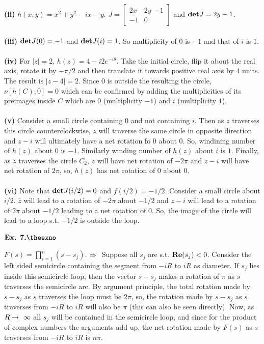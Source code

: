 \documentclass{article}
\def\tf{\textbf}
\def\mf{\ensuremath\mathbf}
\def\det{\ensuremath\mf{det}}
\def\rto{\ensuremath\rightarrow\ }
\def\Rto{\ensuremath\Rightarrow\ }
\newcounter{exno}
\begin{document}
\tf{(ii)} $h(x,y) = x^2+y^2 -ix -y$. $J = \begin{bmatrix}2x&2y-1\\-1&0\end{bmatrix}$ and $\det J = 2y-1$.\\~\\

\tf{(iii)} $\det J(0) = -1$ and $\det J(i) = 1$. So multiplicity of $0$ is $-1$ and that of $i$ is $1$.\\~\\

\tf{(iv)} For $|z|=2$, $h(z)=4-i2e^{-i\theta}$. Take the initial circle, flip it about the real axis, rotate it by $-\pi/2$ and then translate it towards positive real axis by $4$ units. The result is $|z-4|=2$. Since $0$ is outside the resulting the circle, $\nu[h(C),0]=0$ which can be confirmed by adding the multiplicities of its preimages inside $C$ which are $0$ (multiplicity $-1$) and $i$ (multiplicity $1$).\\~\\

\tf{(v)} Consider a small circle containing $0$ and not containing $i$. Then as $z$ traverses this circle counterclockwise, $\bar{z}$ will traverse the same circle in opposite direction and $z-i$ will ultimately have a net rotation fo $0$ about $0$. So, windining number of $h(z)$ about $0$ is $-1$. Similarly winding number of $h(z)$ about $i$ is $1$. Finally, as $z$ traverses the circle $C_2$, $\bar{z}$ will have net rotation of $-2\pi$ and $z-i$ will have net rotation of $2\pi$, so, $h(z)$ has net rotation of $0$ about $0$.\\~\\

\tf{(vi)} Note that $\det J(i/2)=0$ and $f(i/2) = -1/2$. Consider a small circle about $i/2$. $\bar{z}$ will lead to a rotation of $-2\pi$ about $-1/2$ and $z-i$ will lead to a rotation of $2\pi$ about $-1/2$ leading to a net rotation of $0$. So, the image of the circle will lead to a loop s.t. $-1/2$ is outside the loop.

\vspace{0.2in}

${\textbf{Ex. 7.\theexno}}$
\addtocounter{exno}{1}

$F(s) = \prod_{i=1}^{n}(s-s_j)$. $\Rto$ Suppose all $s_j$ are s.t. $\mf{Re}(s_j)<0$. Consider the left sided semicircle containing the segment from $-iR$ to $iR$ as diameter. If $s_j$ lies inside this semicircle loop, then the vector $s-s_j$ makes a rotation of $\pi$ as $s$ traverses the semicircle arc. By argument principle, the total rotation made by $s-s_j$ as $s$ traverses the loop must be $2\pi$, so, the rotation made by $s-s_j$ as $s$ traverses from $-iR$ to $iR$ will also be $\pi$ (this can also be seen directly). Now, as $R\rto\infty$ all $s_j$ will be contained in the semicircle loop, and since for the product of complex numbers the arguments add up, the net rotation made by $F(s)$ as $s$ traverses from $-iR$ to $iR$ is $n\pi$.\\~\\
\end{document}
